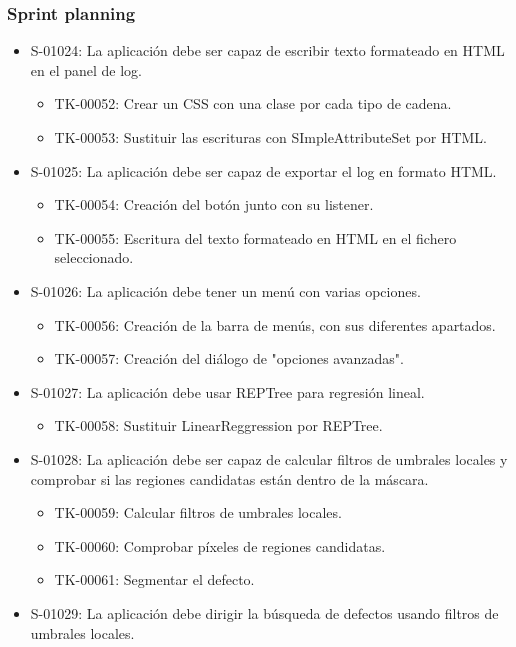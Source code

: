 \subsubsection*{Sprint planning}
\begin{itemize}
 \item S-01024: La aplicación debe ser capaz de escribir texto formateado en HTML en el panel de log.
  \begin{itemize}
   \item TK-00052: Crear un CSS con una clase por cada tipo de cadena.
   \item TK-00053: Sustituir las escrituras con SImpleAttributeSet por HTML.
  \end{itemize}
 \item S-01025: La aplicación debe ser capaz de exportar el log en formato HTML.
  \begin{itemize}
   \item TK-00054: Creación del botón junto con su listener.
   \item TK-00055: Escritura del texto formateado en HTML en el fichero seleccionado.
  \end{itemize}
 \item S-01026: La aplicación debe tener un menú con varias opciones.
  \begin{itemize}
   \item TK-00056: Creación de la barra de menús, con sus diferentes apartados.
   \item TK-00057: Creación del diálogo de "opciones avanzadas".
  \end{itemize}
 \item S-01027: La aplicación debe usar REPTree para regresión lineal.
  \begin{itemize}
   \item TK-00058: Sustituir LinearReggression por REPTree.
  \end{itemize}
 \item S-01028: La aplicación debe ser capaz de calcular filtros de umbrales locales y comprobar si las regiones candidatas están dentro de la máscara.
  \begin{itemize}
   \item TK-00059: Calcular filtros de umbrales locales.
   \item TK-00060: Comprobar píxeles de regiones candidatas.
   \item TK-00061: Segmentar el defecto.
  \end{itemize}
 \item S-01029: La aplicación debe dirigir la búsqueda de defectos usando filtros de umbrales locales.

\end{itemize}
